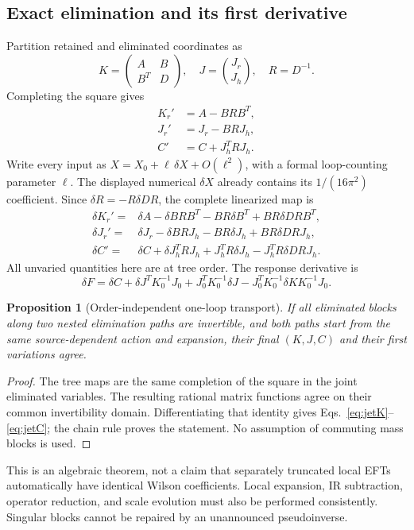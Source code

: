 \documentclass[11pt]{article}
\newtheorem{proposition}{Proposition}
\begin{document}
\subsection{Exact elimination and its first derivative}
Partition retained and eliminated coordinates as
\begin{equation}
 K=\begin{pmatrix}A&B\\B^T&D\end{pmatrix},\quad
 J=\binom{J_r}{J_h},\quad R=D^{-1}.
\end{equation}
Completing the square gives
\begin{align}
 K_r'&=A-BRB^T,\label{eq:treeK}\\
 J_r'&=J_r-BRJ_h,\label{eq:treeJ}\\
 C'&=C+J_h^TRJ_h.\label{eq:treeC}
\end{align}
Write every input as $X=X_0+\ell\,\delta X+O(\ell^2)$, with a formal
loop-counting parameter $\ell$. The displayed numerical $\delta X$
already contains its $1/(16\pi^2)$ coefficient. Since
$\delta R=-R\delta D R$, the complete linearized map is
\begin{align}
 \delta K_r'={}&\delta A-\delta B RB^T-BR\delta B^T
                   +BR\delta D RB^T,\label{eq:jetK}\\
 \delta J_r'={}&\delta J_r-\delta B RJ_h-BR\delta J_h
                   +BR\delta D RJ_h,\label{eq:jetJ}\\
 \delta C'={}&\delta C+\delta J_h^TRJ_h+J_h^TR\delta J_h
                   -J_h^TR\delta D RJ_h.\label{eq:jetC}
\end{align}
All unvaried quantities here are at tree order. The response derivative is
\begin{equation}\label{eq:deltaF}
 \delta F=\delta C+\delta J^TK_0^{-1}J_0+J_0^TK_0^{-1}\delta J
 -J_0^TK_0^{-1}\delta K K_0^{-1}J_0.
\end{equation}

\begin{proposition}[Order-independent one-loop transport]
If all eliminated blocks along two nested elimination paths are
invertible, and both paths start from the same source-dependent action
and expansion, their final $(K,J,C)$ and their first variations agree.
\end{proposition}
\begin{proof}
The tree maps are the same completion of the square in the joint
eliminated variables. The resulting rational matrix functions agree
on their common invertibility domain. Differentiating that identity
gives Eqs.~\eqref{eq:jetK}--\eqref{eq:jetC}; the chain rule proves the
statement. No assumption of commuting mass blocks is used.
\end{proof}
This is an algebraic theorem, not a claim that separately truncated
local EFTs automatically have identical Wilson coefficients. Local
expansion, IR subtraction, operator reduction, and scale evolution must
also be performed consistently. Singular blocks cannot be repaired by an
unannounced pseudoinverse.
\end{document}
